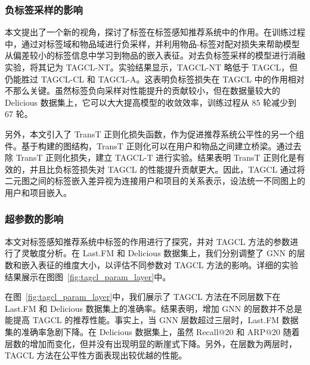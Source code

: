 \subsubsection{负标签采样的影响}
本文提出了一个新的视角，探讨了标签在标签感知推荐系统中的作用。在训练过程中，通过对标签域和物品域进行负采样，并利用物品-标签对配对损失来帮助模型从偏差较小的标签信息中学习到物品的嵌入表征。对去负标签采样的模型进行消融实验，将其记为 TAGCL-NT。实验结果显示，TAGCL-NT 略低于 TAGCL，但仍能胜过 TAGCL-CL 和 TAGCL-A。这表明负标签损失在 TAGCL 中的作用相对不那么关键。虽然标签负向采样对性能提升的贡献较小，但在数据量较大的 Delicious 数据集上，它可以大大提高模型的收敛效率，训练过程从 85 轮减少到 67 轮。

另外，本文引入了 TransT 正则化损失函数，作为促进推荐系统公平性的另一个组件。基于构建的图结构，TransT 正则化可以在用户和物品之间建立桥梁。通过去除 TransT 正则化损失，建立 TAGCL-T 进行实验。结果表明 TransT 正则化是有效的，并且比负标签损失对 TAGCL 的性能提升贡献更大。因此，TAGCL 通过将二元图之间的标签嵌入差异视为连接用户和项目的关系表示，设法统一不同图上的用户和项目嵌入。

\subsubsection{超参数的影响}
本文对标签感知推荐系统中标签的作用进行了探究，并对 TAGCL 方法的参数进行了灵敏度分析。在 Last.FM 和 Delicious 数据集上，我们分别调整了 GNN 的层数和嵌入表征的维度大小，以评估不同参数对 TAGCL 方法的影响。详细的实验结果展示在图图~\ref{fig:tagcl_param_layer}中。

在图~\ref{fig:tagcl_param_layer}中，我们展示了 TAGCL 方法在不同层数下在 Last.FM 和 Delicious 数据集上的准确率。结果表明，增加 GNN 的层数并不总是能提高 TAGCL 的推荐性能。事实上，当 GNN 层数超过三层时，Last.FM 数据集的准确率急剧下降。在 Delicious 数据集上，虽然 Recall@20 和 ARP@20 随着层数的增加而变化，但并没有出现明显的断崖式下降。另外，在层数为两层时，TAGCL 方法在公平性方面表现出较优越的性能。

